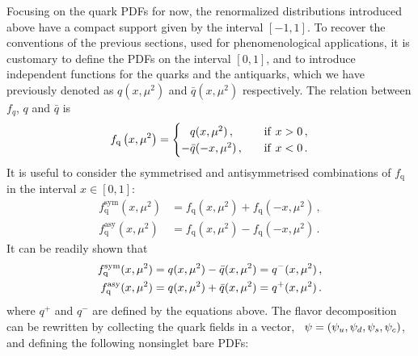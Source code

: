 Focusing on the quark PDFs for now, the renormalized distributions introduced
above have a compact support given by the interval $[-1,1]$. 
To recover the conventions of the previous sections, used for
phenomenological applications, it is customary to define the PDFs on the
interval $[0,1]$, and to introduce independent functions for the quarks and the
antiquarks, which we have previously denoted as $q(x,\mu^2)$ and $\bar{q}(x,\mu^2)$ respectively.
The relation between $f_q$, $q$ and $\bar{q}$ is 
\begin{equation}
    \label{eq:DefFQQbar}
    f_\mathrm{q}\left( x,\mu^2\right) = 
    \begin{cases}
        \phantom{-}q(x,\mu^2)\, , &\quad \mathrm{if}\ x>0\, , \\
        -\bar{q}(-x,\mu^2)\, , &\quad \mathrm{if}\ x<0 \, .
    \end{cases}
\end{equation}
It is useful to consider the symmetrised and antisymmetrised combinations of
$f_\mathrm{q}$ in the interval $x\in[0,1]$:
\begin{eqnarray}
	\label{eq:fsym}
	f^\mathrm{sym}_\mathrm{q}(x,\mu^2)  &= f_\mathrm{q}(x,\mu^2) + f_\mathrm{q}(-x,\mu^2) 
	\, , \\
	\label{eq:fasym}
	f^\mathrm{asy}_\mathrm{q}(x,\mu^2)  &= f_\mathrm{q}(x,\mu^2) - f_\mathrm{q}(-x,\mu^2) \, .
\end{eqnarray}
It can be readily shown that
\begin{align}
    f^{\mathrm{sym}}_\mathrm{q}(x,\mu^2) &= 
    q(x,\mu^2) - \bar{q}(x,\mu^2) = q^-(x,\mu^2) \, , \\
    f^{\mathrm{asy}}_\mathrm{q}(x,\mu^2) &= 
    q(x,\mu^2) + \bar{q}(x,\mu^2) = q^+(x,\mu^2) \, .
\end{align}
where $q^+$ and $q^-$ are defined by the equations above. The flavor
decomposition can be rewritten by collecting the quark fields in a vector, \eg\
$\psi = \left( \psi_u,\psi_d,\psi_s,\psi_c\right)$, and defining the following nonsinglet bare
PDFs:
